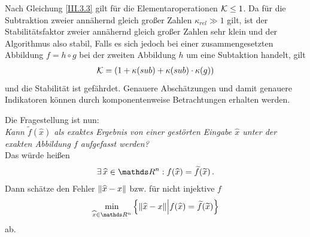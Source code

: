 \begin{Bspe}
  Nach Gleichung \eqref{III.3.3} gilt für die Elementaroperationen $\mathcal{K}\leq 1$.
  Da für die Subtraktion zweier annähernd gleich großer Zahlen $\kappa_{rel}\gg 1$ gilt,
  ist der Stabilitätsfaktor zweier annähernd gleich großer
  Zahlen sehr klein und der Algorithmus also stabil,
  Falls es sich jedoch bei einer zusammengesetzten Abbildung $f=h\circ g$
  bei der zweiten Abbildung $h$ um eine Subtaktion handelt, gilt
  \begin{gather*}
    \mathcal{K} =(1+\kappa(sub)+\kappa(sub)\cdot\kappa(g))
  \end{gather*}
  und die Stabilität ist gefährdet.
  Genauere Abschätzungen und damit genauere Indikatoren
  können durch komponentenweise Betrachtungen erhalten werden.
\end{Bspe}


 
Die Fragestellung ist nun: \\
\textit{Kann $\widetilde{f}(\widehat{x})$ als exaktes Ergebnis von einer gestörten Eingabe $\widehat{x}$ unter der exakten Abbildung $f$ aufgefasst werden?}\\
Das würde heißen
\begin{gather*}
  \exists\, \widehat{x}\in \Ren: f(\widehat{x})= \widetilde{f}(\widetilde{x}) \, .
\end{gather*}
Dann schätze den Fehler $ \left\| \widehat{x}-x \right\|$
bzw. für nicht injektive $f$
\begin{gather*}
  \min_{\widehat{x}\in \Ren}
  \left\{
    \nn{\widehat{x}-x} 
    \middle\vert f(\widehat{x}) = \widetilde{f}(\widetilde{x}) 
  \right\}
\end{gather*} 
ab. \\



